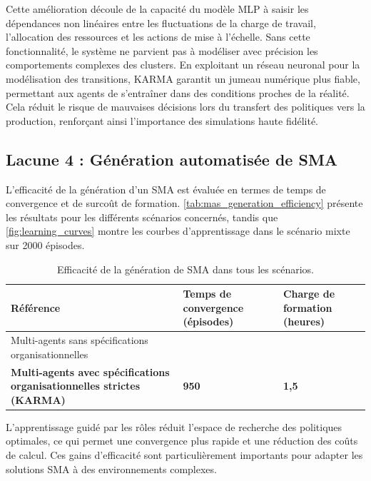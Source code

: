 Cette amélioration découle de la capacité du modèle MLP à saisir les dépendances non linéaires entre les fluctuations de la charge de travail, l'allocation des ressources et les actions de mise à l'échelle. Sans cette fonctionnalité, le système ne parvient pas à modéliser avec précision les comportements complexes des clusters.
%
En exploitant un réseau neuronal pour la modélisation des transitions, KARMA garantit un jumeau numérique plus fiable, permettant aux agents de s'entraîner dans des conditions proches de la réalité. Cela réduit le risque de mauvaises décisions lors du transfert des politiques vers la production, renforçant ainsi l'importance des simulations haute fidélité.



\subsection{Lacune 4 : Génération automatisée de SMA}

L'efficacité de la génération d'un SMA est évaluée en termes de temps de convergence et de surcoût de formation. \autoref{tab:mas_generation_efficiency} présente les résultats pour les différents scénarios concernés, tandis que \autoref{fig:learning_curves} montre les courbes d'apprentissage dans le scénario mixte sur 2000 épisodes.

\begin{table}[h!]
  \centering
  \caption{Efficacité de la génération de SMA dans tous les scénarios.}
  \label{tab:mas_generation_efficiency}
  {
    \footnotesize
    \begin{tabular}{>{\raggedright\arraybackslash}m{3.5cm}>{\centering\arraybackslash}m{2cm}>{\centering\arraybackslash}m{2cm}}
      \hline
      \textbf{Référence}                                                            & \textbf{Temps de convergence (épisodes)} & \textbf{Charge de formation (heures)} \\
      \hline
      Multi-agents sans spécifications organisationnelles                           & 1800                                     & 4                                     \\
      \textbf{Multi-agents avec spécifications organisationnelles strictes (KARMA)} & \textbf{950}                             & \textbf{1,5}                          \\
      \hline
    \end{tabular}}
\end{table}

L'apprentissage guidé par les rôles réduit l'espace de recherche des politiques optimales, ce qui permet une convergence plus rapide et une réduction des coûts de calcul. Ces gains d'efficacité sont particulièrement importants pour adapter les solutions SMA à des environnements complexes.

